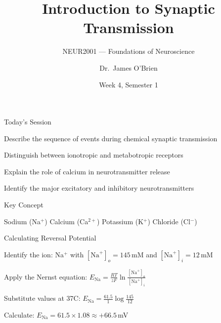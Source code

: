 \documentclass[palette=lecture]{rossbeamerteaching}
\title{Introduction to Synaptic Transmission}
\subtitle{NEUR2001 --- Foundations of Neuroscience}
\author{Dr.~James O'Brien}
\institute{School of Biological Sciences, University of Manchester}
\date{Week 4, Semester 1}
\begin{document}
\begin{frame}[plain]
  \titlepage
\end{frame}

\begin{frame}{Today's Session}
  \begin{learningobjectives}
    \item Describe the sequence of events during chemical synaptic transmission
    \item Distinguish between ionotropic and metabotropic receptors
    \item Explain the role of calcium in neurotransmitter release
    \item Identify the major excitatory and inhibitory neurotransmitters
  \end{learningobjectives}
\end{frame}

\begin{keytermsframe}
\end{keytermsframe}

\begin{frame}{Key Concept}
\end{frame}

  {Sodium (Na$^+$)}
  {Calcium (Ca$^{2+}$)}
  {Potassium (K$^+$)}
  {Chloride (Cl$^-$)}

\begin{frame}{Calculating Reversal Potential}
  \begin{workedexample}
    \item Identify the ion: Na$^+$ with $[\text{Na}^+]_o = 145$\,mM
          and $[\text{Na}^+]_i = 12$\,mM
    \item Apply the Nernst equation:
          $E_{\text{Na}} = \frac{RT}{zF} \ln \frac{[\text{Na}^+]_o}{[\text{Na}^+]_i}$
    \item Substitute values at 37\textdegree C:
          $E_{\text{Na}} = \frac{61.5}{1} \log \frac{145}{12}$
    \item Calculate: $E_{\text{Na}} = 61.5 \times 1.08 \approx +66.5$\,mV
  \end{workedexample}
\end{frame}
\end{document}
